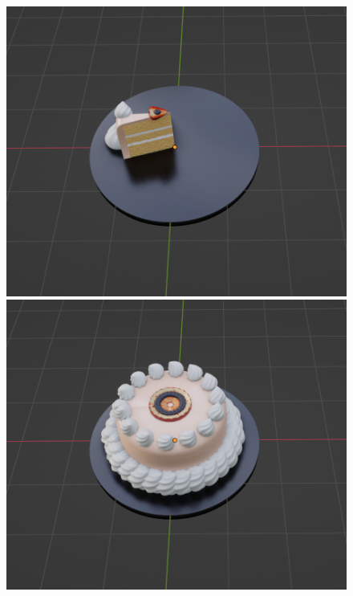 \begin{figure}[h]
 \begin{minipage}[b]{0.48\linewidth}
  \centering
  \includegraphics[scale=0.25]{./imgs/cakeParamMean/cutMin.png}
 \end{minipage}
 \begin{minipage}[b]{0.48\linewidth}
  \centering
  \includegraphics[scale=0.25]{./imgs/cakeParamMean/cutMax.png}
 \end{minipage}\\

\end{figure}

